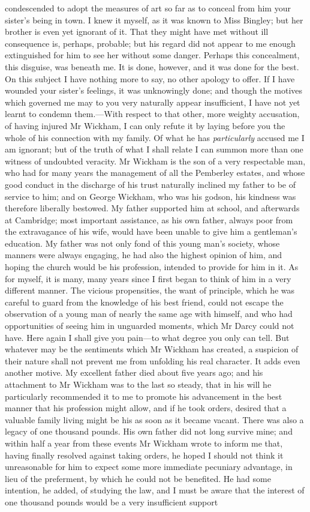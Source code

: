 condescended to adopt the measures of art so far as to conceal from him your sister's being in town. I knew it myself, as it was known to Miss Bingley; but her brother is even yet ignorant of it. That they might have met without ill consequence is, perhaps, probable; but his regard did not appear to me enough extinguished for him to see her without some danger. Perhaps this concealment, this disguise, was beneath me. It is done, however, and it was done for the best. On this subject I have nothing more to say, no other apology to offer. If I have wounded your sister's feelings, it was unknowingly done; and though the motives which governed me may to you very naturally appear insufficient, I have not yet learnt to condemn them.—With respect to that other, more weighty accusation, of having injured Mr Wickham, I can only refute it by laying before you the whole of his connection with my family. Of what he has \textit{particularly} accused me I am ignorant; but of the truth of what I shall relate I can summon more than one witness of undoubted veracity. Mr Wickham is the son of a very respectable man, who had for many years the management of all the Pemberley estates, and whose good conduct in the discharge of his trust naturally inclined my father to be of service to him; and on George Wickham, who was his godson, his kindness was therefore liberally bestowed. My father supported him at school, and afterwards at Cambridge; most important assistance, as his own father, always poor from the extravagance of his wife, would have been unable to give him a gentleman's education. My father was not only fond of this young man's society, whose manners were always engaging, he had also the highest opinion of him, and hoping the church would be his profession, intended to provide for him in it. As for myself, it is many, many years since I first began to think of him in a very different manner. The vicious propensities, the want of principle, which he was careful to guard from the knowledge of his best friend, could not escape the observation of a young man of nearly the same age with himself, and who had opportunities of seeing him in unguarded moments, which Mr Darcy could not have. Here again I shall give you pain—to what degree you only can tell. But whatever may be the sentiments which Mr Wickham has created, a suspicion of their nature shall not prevent me from unfolding his real character. It adds even another motive. My excellent father died about five years ago; and his attachment to Mr Wickham was to the last so steady, that in his will he particularly recommended it to me to promote his advancement in the best manner that his profession might allow, and if he took orders, desired that a valuable family living might be his as soon as it became vacant. There was also a legacy of one thousand pounds. His own father did not long survive mine; and within half a year from these events Mr Wickham wrote to inform me that, having finally resolved against taking orders, he hoped I should not think it unreasonable for him to expect some more immediate pecuniary advantage, in lieu of the preferment, by which he could not be benefited. He had some intention, he added, of studying the law, and I must be aware that the interest of one thousand pounds would be a very insufficient support 